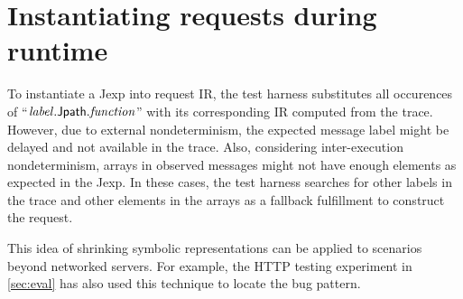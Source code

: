 \section{Instantiating requests during runtime}
To instantiate a Jexp into request IR, the test harness substitutes all
occurences of ``$\mathit{label}.\mathsf{Jpath}.\mathit{function}$''
with its corresponding IR computed from the trace.  However, due to external
nondeterminism, the expected message label might be delayed and not available in
the trace.  Also, considering inter-execution nondeterminism, arrays in observed
messages might not have enough elements as expected in the Jexp.  In these
cases, the test harness searches for other labels in the trace and other
elements in the arrays as a fallback fulfillment to construct the request.


This idea of shrinking symbolic representations can be applied to scenarios
beyond networked servers.  For example, the HTTP testing experiment in
\autoref{sec:eval} has also used this technique to locate the bug pattern.
